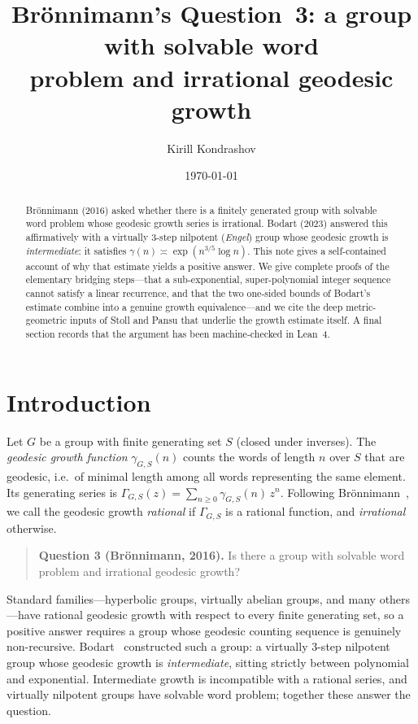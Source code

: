 \documentclass[reqno]{amsart}
\title{Br\"onnimann's Question~3: a group with solvable word\\ problem and irrational geodesic growth}
\author{Kirill Kondrashov}
\date{\today}
\theoremstyle{plain}
\theoremstyle{definition}
\theoremstyle{remark}
\newcommand{\geod}{\gamma}
\begin{document}
\begin{abstract}
  Br\"onnimann (2016) asked whether there is a finitely generated group with solvable word
  problem whose geodesic growth series is irrational. Bodart (2023) answered this affirmatively
  with a virtually $3$-step nilpotent (\emph{Engel}) group whose geodesic growth is
  \emph{intermediate}: it satisfies $\geod(n)\asymp \exp(n^{3/5}\log n)$. This note gives a
  self-contained account of why that estimate yields a positive answer. We give complete proofs
  of the elementary bridging steps---that a sub-exponential, super-polynomial integer sequence
  cannot satisfy a linear recurrence, and that the two one-sided bounds of Bodart's estimate
  combine into a genuine growth equivalence---and we cite the deep metric-geometric inputs of
  Stoll and Pansu that underlie the growth estimate itself. A final section records that the
  argument has been machine-checked in Lean~4.
\end{abstract}

\maketitle

\section{Introduction}

Let $G$ be a group with finite generating set $S$ (closed under inverses). The
\emph{geodesic growth function} $\geod_{G,S}(n)$ counts the words of length $n$ over $S$ that are
geodesic, i.e.\ of minimal length among all words representing the same element. Its generating
series is $\Gamma_{G,S}(z)=\sum_{n\ge0}\geod_{G,S}(n)\,z^n$. Following Br\"onnimann~\cite{Bronnimann},
we call the geodesic growth \emph{rational} if $\Gamma_{G,S}$ is a rational function, and
\emph{irrational} otherwise.

\begin{quote}
\textbf{Question 3 (Br\"onnimann, 2016).} Is there a group with solvable word problem and
irrational geodesic growth?
\end{quote}

Standard families---hyperbolic groups, virtually abelian groups, and many others---have rational
geodesic growth with respect to every finite generating set, so a positive answer requires a
group whose geodesic counting sequence is genuinely non-recursive. Bodart~\cite{Bodart}
constructed such a group: a virtually $3$-step nilpotent group whose geodesic growth is
\emph{intermediate}, sitting strictly between polynomial and exponential. Intermediate growth is
incompatible with a rational series, and virtually nilpotent groups have solvable word problem;
together these answer the question.
\end{document}
